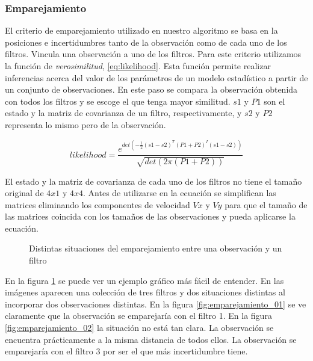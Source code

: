 \subsubsection{Emparejamiento}
\label{subsubsec:emparejamiento}

El criterio de emparejamiento utilizado en nuestro algoritmo se basa en la posiciones e incertidumbres tanto de la observación como de cada uno de los filtros. Vincula una observación a uno de los filtros. Para este criterio utilizamos la función de \textit{verosimilitud}, \ref{eq:likelihood}. Esta función permite realizar inferencias acerca del valor de los parámetros de un modelo estadístico a partir de un conjunto de observaciones. En este paso se compara la observación obtenida con todos los filtros y se escoge el que tenga mayor similitud. $s1$ y $P1$ son el estado y la matriz de covarianza de un filtro, respectivamente, y $s2$ y $P2$ representa lo mismo pero de la observación.

\begin{equation}
\label{eq:likelihood}
likelihood = \frac{ e^{ det(-\frac{1}{2} (s1-s2)^T (P1+P2)^I (s1-s2) )} }
                  { \sqrt{ det(2\pi(P1+P2)) } }
\end{equation}

El estado y la matriz de covarianza de cada uno de los filtros no tiene el tamaño original de $4x1$ y $4x4$. Antes de utilizarse en la ecuación se simplifican las matrices eliminando los componentes de velocidad $Vx$ y $Vy$ para que el tamaño de las matrices coincida con los tamaños de las observaciones y pueda aplicarse la ecuación.\\

\begin{figure}[h]
  \centering
  \caption{Distintas situaciones del emparejamiento entre una observación y un filtro}
  \label{fig:emparejamientos}
\end{figure}

En la figura \ref{fig:emparejamientos} se puede ver un ejemplo gráfico más fácil de entender. En las imágenes aparecen una colección de tres filtros y dos situaciones distintas al incorporar dos observaciones distintas. En la figura \ref{fig:emparejamiento_01} se ve claramente que la observación se emparejaría con el filtro 1. En la figura \ref{fig:emparejamiento_02} la situación no está tan clara. La observación se encuentra prácticamente a la misma distancia de todos ellos. La observación se emparejaría con el filtro 3 por ser el que más incertidumbre tiene.


